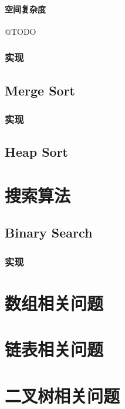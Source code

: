 \documentclass[UTF8]{report}
\begin{document}
\subsubsection{空间复杂度}
@TODO

\subsection{实现}

 


\section{Merge Sort}


\subsection{实现}




\section{Heap Sort}


\chapter{搜索算法}


\section{Binary Search}

\subsection{实现}

 
 



\chapter{数组相关问题}

\chapter{链表相关问题}

\chapter{二叉树相关问题}

\end{document}
